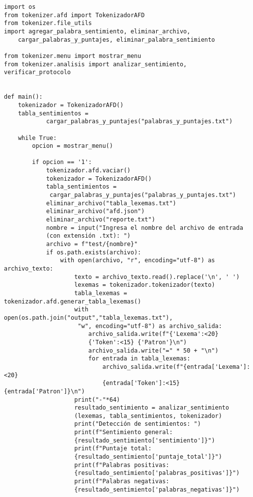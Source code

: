 \documentclass[12pt,a4paper]{article}
\begin{document}
\begin{verbatim}
import os
from tokenizer.afd import TokenizadorAFD
from tokenizer.file_utils 
import agregar_palabra_sentimiento, eliminar_archivo,
    cargar_palabras_y_puntajes, eliminar_palabra_sentimiento

from tokenizer.menu import mostrar_menu
from tokenizer.analisis import analizar_sentimiento, verificar_protocolo


def main():
    tokenizador = TokenizadorAFD()
    tabla_sentimientos = 
            cargar_palabras_y_puntajes("palabras_y_puntajes.txt")

    while True:
        opcion = mostrar_menu()

        if opcion == '1':
            tokenizador.afd.vaciar() 
            tokenizador = TokenizadorAFD()
            tabla_sentimientos =
             cargar_palabras_y_puntajes("palabras_y_puntajes.txt")
            eliminar_archivo("tabla_lexemas.txt")
            eliminar_archivo("afd.json")
            eliminar_archivo("reporte.txt")
            nombre = input("Ingresa el nombre del archivo de entrada 
            (con extensión .txt): ")
            archivo = f"test/{nombre}"
            if os.path.exists(archivo):
                with open(archivo, "r", encoding="utf-8") as archivo_texto:
                    texto = archivo_texto.read().replace('\n', ' ')                    
                    lexemas = tokenizador.tokenizador(texto)
                    tabla_lexemas = tokenizador.afd.generar_tabla_lexemas()
                    with open(os.path.join("output","tabla_lexemas.txt"),
                     "w", encoding="utf-8") as archivo_salida:
                        archivo_salida.write(f"{'Lexema':<20} 
                        {'Token':<15} {'Patron'}\n")
                        archivo_salida.write("=" * 50 + "\n")
                        for entrada in tabla_lexemas:
                            archivo_salida.write(f"{entrada['Lexema']:<20} 
                            {entrada['Token']:<15} {entrada['Patron']}\n")
                    print("-"*64)
                    resultado_sentimiento = analizar_sentimiento
                    (lexemas, tabla_sentimientos, tokenizador)
                    print("Detección de sentimientos: ")
                    print(f"Sentimiento general: 
                    {resultado_sentimiento['sentimiento']}")
                    print(f"Puntaje total: 
                    {resultado_sentimiento['puntaje_total']}")
                    print(f"Palabras positivas: 
                    {resultado_sentimiento['palabras_positivas']}")
                    print(f"Palabras negativas: 
                    {resultado_sentimiento['palabras_negativas']}")


\end{verbatim}
\end{document}
